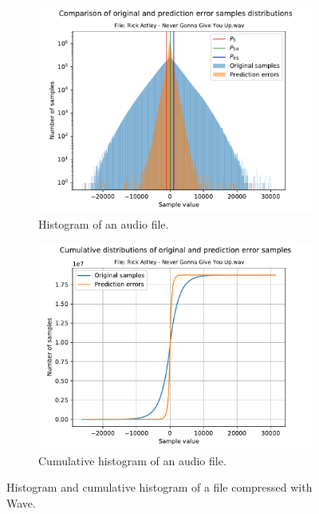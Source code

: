 \begin{figure}[h!]
	\centering
	\begin{subfigure}{0.5\textwidth}
		\centering
		\includegraphics[width=\linewidth]{images/Rick Astley - Never Gonna Give You Up.wav_hist.pdf}
		\caption{Histogram of an audio file.}
		\label{fig:hist_example}
	\end{subfigure}%
	\begin{subfigure}{0.5\textwidth}
		\centering
		\includegraphics[width=\linewidth]{images/Rick Astley - Never Gonna Give You Up.wav_hist_cum.pdf}
		\caption{Cumulative histogram of an audio file.}
		\label{fig:sub2}
	\end{subfigure}
	\caption{Histogram and cumulative histogram of a file compressed with Wave.}
	\label{fig:test}
\end{figure}


